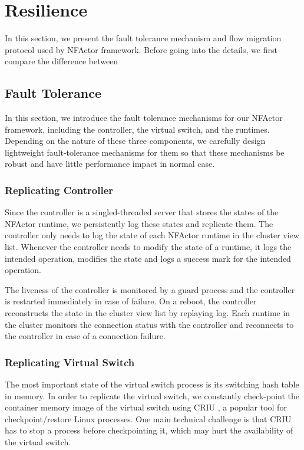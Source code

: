 \section{Resilience}

In this section, we present the fault tolerance mechanism and flow migration protocol used by NFActor framework. Before going into the details, we first compare the difference between 

\subsection{Fault Tolerance}
\label{sec:ft}

In this section, we introduce the fault tolerance mechanisms for our NFActor
framework, including the controller, the virtual switch, and the runtimes. 
Depending on the nature of these three components, we carefully design 
lightweight fault-tolerance mechanisms for them so that these mechanisms be 
robust and have little performance impact in normal case.

\subsubsection{Replicating Controller}

Since the controller is a singled-threaded server that stores the states of 
the NFActor runtime, we persistently log these states and replicate them. The 
controller only needs to log the state of each NFActor runtime in 
the cluster view list. Whenever the controller needs to modify the state of a 
runtime, it logs the intended operation, modifies the state and logs a success 
mark for the intended operation.

The liveness of the controller is monitored by a guard process and the 
controller is restarted immediately in case of failure. On a reboot, the 
controller reconstructs the state in the cluster view list by replaying log. 
Each runtime in the cluster monitors the connection status with the controller 
and reconnects to the controller in case of a connection failure.

\subsubsection{Replicating Virtual Switch}

The most important state of the virtual switch process is its switching hash 
table in memory. In order to replicate the virtual switch, we constantly 
check-point the container memory image of the virtual switch using CRIU 
\cite{criu}, a popular tool for checkpoint/restore Linux processes. One main 
technical challenge is that CRIU has to stop a process before checkpointing it, 
which may hurt the availability of the virtual switch.

